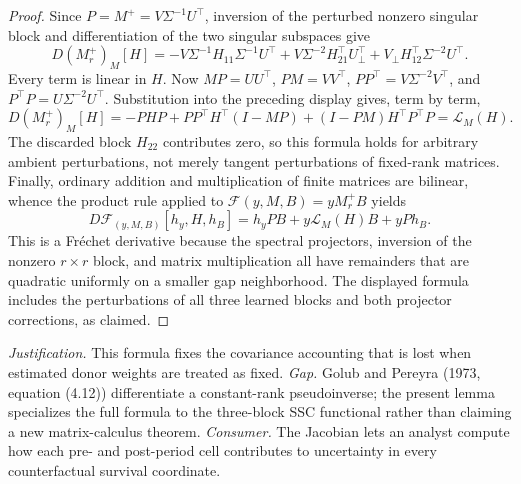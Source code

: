 \documentclass{article}
\begin{document}
\begin{proof}
Since \(P=M^+=V\Sigma^{-1}U^\top\), inversion of the perturbed nonzero singular block and differentiation of the two singular subspaces give
\[
 D(M_r^+)_M[H]
 =-V\Sigma^{-1}H_{11}\Sigma^{-1}U^\top
 +V\Sigma^{-2}H_{21}^\top U_\perp^\top
 +V_\perp H_{12}^\top\Sigma^{-2}U^\top.
\]
Every term is linear in \(H\).  Now \(MP=UU^\top\), \(PM=VV^\top\), \(PP^\top=V\Sigma^{-2}V^\top\), and \(P^\top P=U\Sigma^{-2}U^\top\).  Substitution into the preceding display gives, term by term,
\[
 D(M_r^+)_M[H]
 =-PHP+PP^\top H^\top(I-MP)+(I-PM)H^\top P^\top P
 =\mathcal L_M(H).
\]
The discarded block \(H_{22}\) contributes zero, so this formula holds for arbitrary ambient perturbations, not merely tangent perturbations of fixed-rank matrices.  Finally, ordinary addition and multiplication of finite matrices are bilinear, whence the product rule applied to \(\mathcal F(y,M,B)=yM_r^+B\) yields
\[
 D\mathcal F_{(y,M,B)}[h_y,H,h_B]
 =h_yPB+y\mathcal L_M(H)B+yPh_B.
\]
This is a Fr\'echet derivative because the spectral projectors, inversion of the nonzero \(r\times r\) block, and matrix multiplication all have remainders that are quadratic uniformly on a smaller gap neighborhood.  The displayed formula includes the perturbations of all three learned blocks and both projector corrections, as claimed.
\end{proof}
\par\smallskip\noindent \textit{Justification.} This formula fixes the covariance accounting that is lost when estimated donor weights are treated as fixed. \textit{Gap.} Golub and Pereyra (1973, equation (4.12)) differentiate a constant-rank pseudoinverse; the present lemma specializes the full formula to the three-block SSC functional rather than claiming a new matrix-calculus theorem. \textit{Consumer.} The Jacobian lets an analyst compute how each pre- and post-period cell contributes to uncertainty in every counterfactual survival coordinate.
\end{document}
